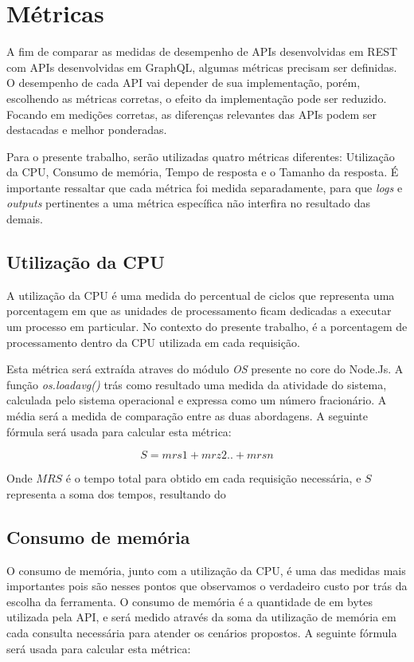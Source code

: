 \section{Métricas}\label{sec:metrics}

A fim de comparar as medidas de desempenho de APIs desenvolvidas em REST com APIs desenvolvidas em GraphQL, algumas métricas precisam ser definidas. O desempenho de cada API vai depender de sua implementação, porém, escolhendo as métricas corretas, o efeito da implementação pode ser reduzido. Focando em medições corretas, as diferenças relevantes das APIs podem ser destacadas e melhor ponderadas.

Para o presente trabalho, serão utilizadas quatro métricas diferentes: Utilização da CPU, Consumo de memória, Tempo de resposta e o Tamanho da resposta. É importante ressaltar que cada métrica foi medida separadamente, para que \textit{logs} e \textit{outputs} pertinentes a uma métrica específica não interfira no resultado das demais.

\subsection*{Utilização da CPU}

A utilização da CPU é uma medida do percentual de ciclos que representa uma porcentagem em que as unidades de processamento ficam dedicadas a executar um processo em particular. No contexto do presente trabalho, é a porcentagem de processamento dentro da CPU utilizada em cada requisição.

Esta métrica será extraída atraves do módulo \textit{OS} presente no \textrm{core} do Node.Js. A função \textit{os.loadavg()} trás como resultado uma medida da atividade do sistema, calculada pelo sistema operacional e expressa como um número fracionário. A média será a medida de comparação entre as duas abordagens. A seguinte fórmula será usada para calcular esta métrica: 

$$S=mrs1+mrz2..+mrsn$$

Onde $MRS$ é o tempo total para obtido em cada requisição necessária, e $S$ representa a soma dos tempos, resultando do 

\subsection*{Consumo de memória}

O consumo de memória, junto com a utilização da CPU, é uma das medidas mais importantes pois são nesses pontos que observamos o verdadeiro custo por trás da escolha da ferramenta. O consumo de memória é a quantidade de em bytes utilizada pela API, e será medido através da soma da utilização de memória em cada consulta necessária para atender os cenários propostos. A seguinte fórmula será usada para calcular esta métrica: 

